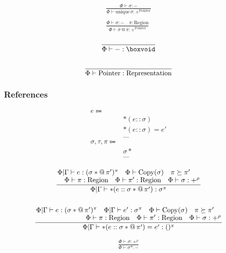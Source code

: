 \documentclass {article}
\begin{document}
\begin{gather*}
\frac
{\Phi \vdash \sigma : -}
{\Phi \vdash \text{unique} \, \sigma : +^\text{Pointer}} \\
\\
\frac
{\Phi \vdash \sigma : - \quad \pi : \text{Region}}
{\Phi \vdash \sigma \, @ \, \pi : +^\text{Pointer}} 
\end{gather*}

\begin{gather*}
\frac
{}
{\Phi \vdash - : \boxvoid} \\
\\
\frac
{}
{\Phi \vdash \text{Pointer} : \text{Representation}} \\
\end{gather*}

\subsubsection{References}
\begin{align*}
e \Coloneqq & \\
& *(e :: \sigma) \tag{Read Pointer} \\
& *(e :: \sigma) = e' \tag{Write Pointer} \\
& \dots \\
\sigma, \tau, \pi \Coloneqq & \\
& \sigma * \tag{Pointer} \\
& \dots \\
\end{align*}

\begin{gather*}
\frac
{\splitfrac{\Phi | \Gamma \vdash e : (\sigma * @ \, {\pi'})^\pi \quad \Phi \vdash \text{Copy} (\sigma) \quad \pi \succeq \pi'}
{\Phi \vdash \pi : \text{Region} \quad \Phi \vdash \pi' : \text{Region} \quad \Phi \vdash \sigma : +^{\rho}}}
{\Phi | \Gamma \vdash * (e :: \sigma * @ \, {\pi'})  : \sigma^\pi} \\
\\
\frac
{\splitfrac{\Phi | \Gamma \vdash e : (\sigma * @ \, {\pi'})^\pi \quad \Phi | \Gamma \vdash e' : \sigma^\pi  \quad \Phi \vdash \text{Copy} (\sigma) \quad \pi \succeq \pi'}
{\Phi \vdash \pi : \text{Region} \quad \Phi \vdash \pi' : \text{Region} \quad \Phi \vdash \sigma : +^{\rho}}}
{\Phi | \Gamma \vdash *(e :: \sigma * @ \,{\pi'}) = e' : ()^\pi }
\end{gather*}

\begin{gather*}
\frac
{\Phi \vdash \sigma : +^{\rho}}
{\Phi \vdash \sigma * : -}
\end{gather*}
\end{document}

